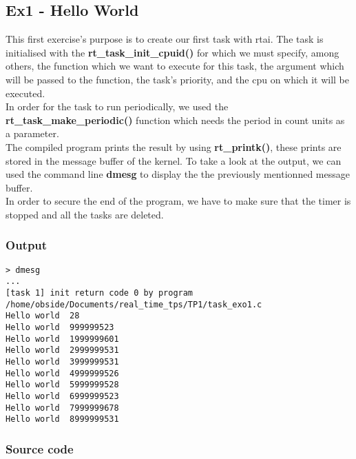 \subsection{Ex1 - Hello World}
This first exercise's purpose is to create our first task with rtai. The task is initialised with the \textbf{rt\_task\_init\_cpuid()} for which we must specify, among others, the function which we want to execute for this task, the argument which will be passed to the function, the task's priority, and the cpu on which it will be executed.\\

In order for the task to run periodically, we used the \textbf{rt\_task\_make\_periodic()} function which needs the period in count units as a parameter. \\

The compiled program prints the result by using \textbf{rt\_printk()}, these prints are stored in the message buffer of the kernel. To take a look at the output, we can used the command line \textbf{dmesg} to display the the previously mentionned message buffer. \\

In order to secure the end of the program, we have to make sure that the timer is stopped and all the tasks are deleted.

\subsubsection{Output}
\begin{lstlisting}[keywordstyle=\color{black}]
> dmesg
...
[task 1] init return code 0 by program /home/obside/Documents/real_time_tps/TP1/task_exo1.c
Hello world  28
Hello world  999999523
Hello world  1999999601
Hello world  2999999531
Hello world  3999999531
Hello world  4999999526
Hello world  5999999528
Hello world  6999999523
Hello world  7999999678
Hello world  8999999531
\end{lstlisting}

\subsubsection{Source code}

